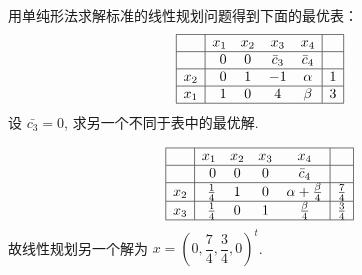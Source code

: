 \begin{Problem}
    用单纯形法求解标准的线性规划问题得到下面的最优表：
    \[\begin{array}{|l|rccc|c|}
        \hline & x_{1} & x_{2} & x_{3} & x_{4} & \\
        \hline & 0 & 0 & \bar{c}_{3} & \bar{c}_{4} & \\
        \hline x_{2} & 0 & 1 & -1 & \alpha & 1 \\
        \hline x_{1} & 1 & 0 & 4 & \beta & 3 \\
        \hline
    \end{array}\]
    设 $\bar{c_3} = 0$, 求另一个不同于表中的最优解.

    \Answer 
    \[\begin{array}{|l|rccc|c|}
        \hline & x_{1} & x_{2} & x_{3} & x_{4} & \\
        \hline & 0 & 0 & 0 & \bar{c}_{4} & \\
        \hline x_{2} & \frac{1}{4} & 1 & 0 & \alpha + \frac{\beta}{4} & \frac{7}{4} \\
        \hline x_{3} & \frac{1}{4} & 0 & 1 & \frac{\beta}{4} & \frac{3}{4} \\
        \hline
    \end{array}\]
    故线性规划另一个解为 $x = \left(0, \dfrac{7}{4}, \dfrac{3}{4}, 0\right)^t$.
\end{Problem}

